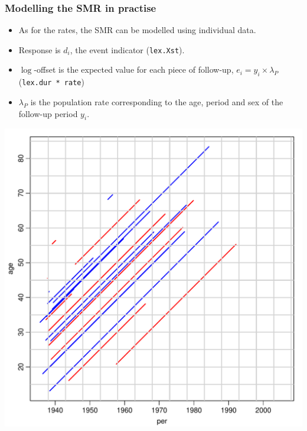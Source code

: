\begin{frame}
  \frametitle{Modelling the SMR in practise}
  \begin{itemize}[<+->]
  \item As for the rates, the SMR can be modelled using individual
    data.
  \item Response is $d_i$, the event indicator (\texttt{lex.Xst}).
  \item $\log$-offset is the expected value for each piece of
    follow-up, $e_i=y_i \times \lambda_P$ (\texttt{lex.dur * rate})
  \item $\lambda_P$ is the population rate corresponding to the age,
    period and sex of the follow-up period $y_i$.
  \end{itemize}
\end{frame}

\begin{frame}[fragile]
\includegraphics[height=0.99\textheight,keepaspectratio]{thL-lexis3}
\end{frame}

